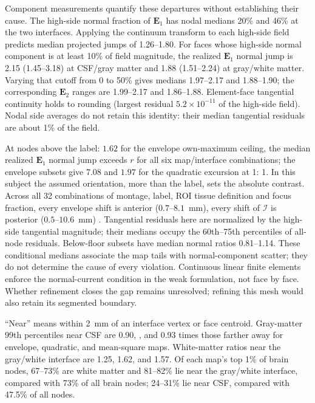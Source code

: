 \documentclass[11pt,a4paper]{article}
\providecommand{\DIFaddtex}[1]{{\protect\color{blue} \sf #1}} %
\providecommand{\DIFdeltex}[1]{{\protect\color{red} \scriptsize #1}} %
\providecommand{\DIFaddbegin}{} %
\providecommand{\DIFaddend}{} %
\providecommand{\DIFdelbegin}{} %
\providecommand{\DIFdelend}{} %
\providecommand{\DIFadd}[1]{\texorpdfstring{\DIFaddtex{#1}}{#1}} %
\providecommand{\DIFdel}[1]{\texorpdfstring{\DIFdeltex{#1}}{}} %
\begin{document}
\DIFadd{Component measurements quantify these departures without establishing their
cause. The high-side normal fraction of $\mathbf E_1$ has nodal medians
20\% and 46\% at the two interfaces. Applying the continuum transform to
each high-side field predicts median projected jumps of 1.26--1.80.
For faces whose high-side normal component is at least 10\% of field magnitude,
the realized $\mathbf E_1$ normal jump is 2.15 (1.45--3.18) at CSF/gray matter
and 1.88 (1.51--2.24) at gray/white matter. Varying that cutoff from 0 to 50\%
gives medians 1.97--2.17 and 1.88--1.90; the corresponding $\mathbf E_2$
ranges are 1.99--2.17 and 1.86--1.88. Element-face tangential continuity holds
to rounding (largest residual $5.2\times10^{-11}$ of the high-side field).
Nodal side averages do not retain this identity: their median tangential
residuals are about 1\% of the field.
}

\DIFadd{At nodes above }\DIFaddend the \DIFdelbegin \DIFdel{label: $1.62$ for the envelope }\DIFdelend \DIFaddbegin \DIFadd{own-maximum ceiling, the median realized $\mathbf E_1$
normal jump exceeds $r$ for all six map/interface combinations; the envelope
subsets give 7.08 }\DIFaddend and \DIFdelbegin \DIFdel{$1.97$ for the quadratic excursion at 1: 1. In
this subject the assumed orientation,
more than the
label, sets the
absolute contrast. Across all 32 combinations of montage, label, ROI tissue definition and focus fraction,
every envelope shift is anterior ($0.7$--$8.1$~mm), every shift of $\mathcal I$ is
posterior ($0.5$--$10.6$~mm)}\DIFdelend \DIFaddbegin \DIFadd{2.80. Tangential residuals here are normalized by the
high-side tangential magnitude; their medians occupy the 60th--75th
percentiles of all-node residuals. Below-floor subsets have median normal
ratios 0.81--1.14. These conditional medians associate the map tails with
normal-component scatter; they do not determine the cause of every violation.
Continuous linear finite elements enforce the normal-current condition in
the weak formulation, not face by face. Whether refinement closes the gap
remains unresolved; refining this mesh would also retain its segmented boundary.
}

\DIFadd{``Near'' means within 2~mm of an interface vertex or face centroid.
Gray-matter 99th percentiles near CSF are 0.90}\DIFaddend , \DIFaddbegin \DIFadd{0.86, and 0.93 times those
farther away for envelope, quadratic, and mean-square maps. White-matter
ratios near the gray/white interface are 1.25, 1.62, and 1.57. Of each map's
top 1\% of brain nodes, 67--73\% are white matter and 81--82\% lie near the
gray/white interface, compared with 73\% of all brain nodes; 24--31\% lie
near CSF, compared with 47.5\% of all nodes.
}
\end{document}
